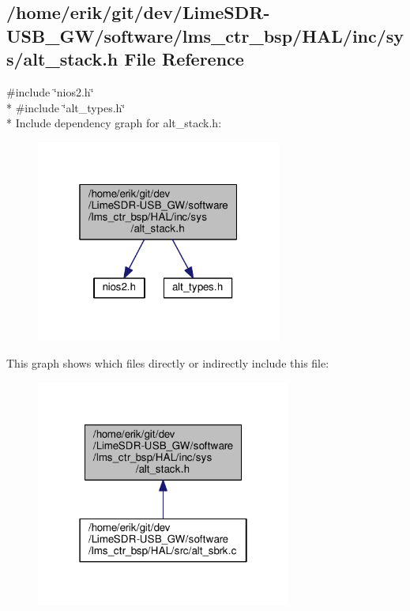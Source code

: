\subsection{/home/erik/git/dev/\+Lime\+S\+D\+R-\/\+U\+S\+B\+\_\+\+G\+W/software/lms\+\_\+ctr\+\_\+bsp/\+H\+A\+L/inc/sys/alt\+\_\+stack.h File Reference}
\label{alt__stack_8h}
{\ttfamily \#include \char`\"{}nios2.\+h\char`\"{}}\\*
{\ttfamily \#include \char`\"{}alt\+\_\+types.\+h\char`\"{}}\\*
Include dependency graph for alt\+\_\+stack.\+h\+:
\nopagebreak
\begin{figure}[H]
\begin{center}
\leavevmode
\includegraphics[width=229pt]{d7/dd3/alt__stack_8h__incl}
\end{center}
\end{figure}
This graph shows which files directly or indirectly include this file\+:
\nopagebreak
\begin{figure}[H]
\begin{center}
\leavevmode
\includegraphics[width=238pt]{da/d9a/alt__stack_8h__dep__incl}
\end{center}
\end{figure}

